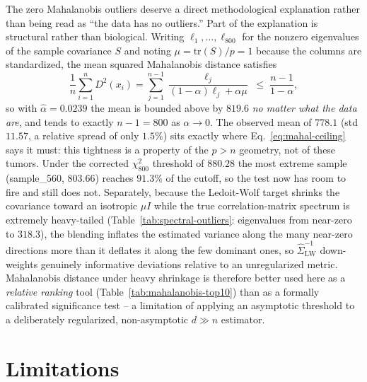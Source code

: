 \documentclass[11pt]{article}
\begin{document}
The zero Mahalanobis outliers deserve a direct methodological explanation
rather than being read as ``the data has no outliers.'' Part of the
explanation is structural rather than biological. Writing
$\ell_1, \dots, \ell_{800}$ for the nonzero eigenvalues of the sample
covariance $S$ and noting $\mu = \mathrm{tr}(S)/p = 1$ because the columns
are standardized, the mean squared Mahalanobis distance satisfies
\begin{equation}
\frac{1}{n} \sum_{i=1}^n D^2(x_i) = \sum_{j=1}^{n-1} \frac{\ell_j}{(1-\alpha)\ell_j + \alpha \mu} \;\leq\; \frac{n-1}{1-\alpha},
\label{eq:mahal-ceiling}
\end{equation}
so with $\hat\alpha = 0.0239$ the mean is bounded above by $819.6$
\emph{no matter what the data are}, and tends to exactly $n-1=800$ as
$\alpha \to 0$. The observed mean of $778.1$ (std $11.57$, a relative
spread of only $1.5\%$) sits exactly where Eq.~\ref{eq:mahal-ceiling} says
it must: this tightness is a property of the $p>n$ geometry, not of these
tumors. Under the corrected $\chi^2_{800}$ threshold of $880.28$ the most
extreme sample (sample\_560, $803.66$) reaches $91.3\%$ of the cutoff, so
the test now has room to fire and still does not. Separately, because the
Ledoit-Wolf target shrinks the covariance toward an isotropic $\mu I$ while
the true correlation-matrix spectrum is extremely heavy-tailed
(Table~\ref{tab:spectral-outliers}: eigenvalues from near-zero to $318.3$),
the blending inflates the estimated variance along the many near-zero
directions more than it deflates it along the few dominant ones, so
$\hat\Sigma_{\text{LW}}^{-1}$ down-weights genuinely informative deviations
relative to an unregularized metric. Mahalanobis distance under heavy
shrinkage is therefore better used here as a \emph{relative ranking} tool
(Table~\ref{tab:mahalanobis-top10}) than as a formally calibrated
significance test -- a limitation of applying an asymptotic threshold to a
deliberately regularized, non-asymptotic $d \gg n$ estimator.

\section{Limitations}
\label{sec:limitations}
\end{document}
